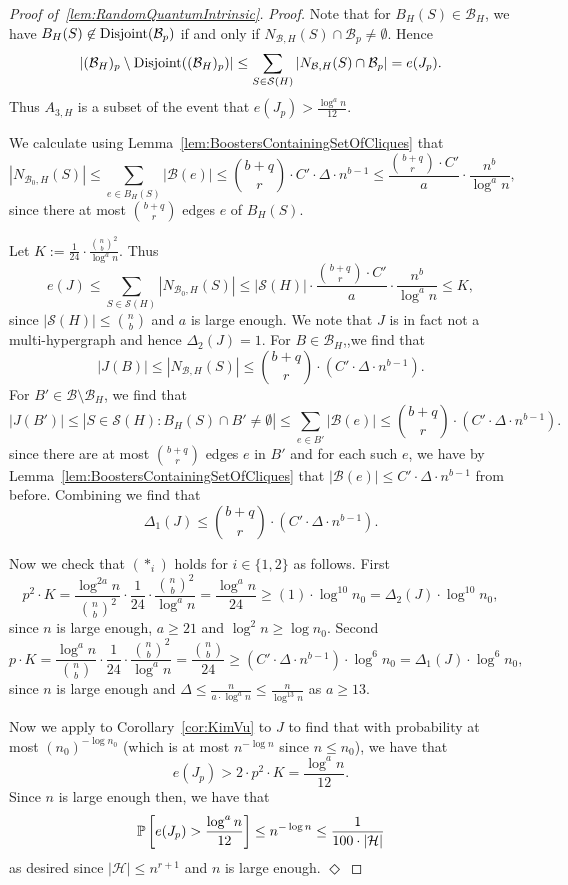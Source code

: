 \documentclass[11pt]{article}
\newcommand{\mc}[1]{\mathcal{#1}}
\newcounter{i}
\theoremstyle{plain}
\newenvironment{proofclaim}[1][]%
{\noindent \emph{Proof.} {}{#1}{}}{\hfill
	$\Diamond$\vspace{1em}}
\renewcommand{\theclaim}{\thetheorem.\arabic{claim}}
\newenvironment{lateproof}[1]
 {%
  \renewcommand{\theclaim}{\ref{#1}.\arabic{claim}}%
  \begin{proof}[Proof of~\cref{#1}]%
 }
 {\end{proof}}
\theoremstyle{plain} %
\theoremstyle{definition}
\newcommand{\Prob}[1]{\ensuremath{%
\mathbb P\left[#1\right]
}}
\begin{document}
\begin{lateproof}{lem:RandomQuantumIntrinsic}
\begin{proofclaim}
Note that for $B_H(S)\in \mc{B}_{H}$, we have $B_H(S)\not\in {\rm Disjoint}(\mc{B}_p)$ if and only if $N_{\mathcal{B},H}(S)\cap \mathcal{B}_p\ne \emptyset$. Hence
$$|(\mathcal{B}_{H})_p\setminus {\rm Disjoint}((\mathcal{B}_{H})_p)| \le \sum_{S\in \mc{S}(H)} |N_{\mathcal{B},H}(S)\cap \mathcal{B}_p| = e(J_p).$$
Thus $A_{3,H}$ is a subset of the event that $e(J_p) > \frac{\log^{a} n}{12}$.

We calculate using Lemma~\ref{lem:BoostersContainingSetOfCliques} that
$$ |N_{\mathcal{B}_0,H}(S)| \le \sum_{e\in B_H(S)} |\mc{B}(e)| \le \binom{b+q}{r} \cdot C' \cdot \Delta \cdot n^{b-1} \le \frac{\binom{b+q}{r} \cdot C'}{a}\cdot \frac{n^b}{\log^{a} n},$$
since there at most $\binom{b+q}{r}$ edges $e$ of $B_H(S)$.

Let $K:= \frac{1}{24} \cdot \frac{\binom{n}{b}^2}{\log^{a} n}$. Thus
$$e(J) \le \sum_{S\in \mc{S}(H)} |N_{\mathcal{B}_0,H}(S)| \le |\mc{S}(H)|\cdot \frac{\binom{b+q}{r} \cdot C'}{a}\cdot \frac{n^b}{\log^{a} n} \le K,$$
since $|\mc{S}(H)|\le \binom{n}{b}$ and $a$ is large enough. We note that $J$ is in fact not a multi-hypergraph and hence $\Delta_2(J) = 1$.
For $B\in \mc{B}_H$,,we find that
$$|J(B)| \le |N_{\mc{B},H}(S)| \le \binom{b+q}{r}\cdot (C'\cdot \Delta \cdot n^{b-1}).$$
For $B'\in \mc{B}\setminus \mc{B}_H$, we find that
$$|J(B')| \le |S\in \mc{S}(H): B_H(S)\cap B'\ne \emptyset| \le \sum_{e\in B'} |\mc{B}(e)| \le \binom{b+q}{r}\cdot (C'\cdot \Delta \cdot n^{b-1}).$$
since there are at most $\binom{b+q}{r}$ edges $e$ in $B'$ and for each such $e$, we have by Lemma~\ref{lem:BoostersContainingSetOfCliques} that $|\mc{B}(e)| \le C'\cdot \Delta \cdot n^{b-1}$ from before. Combining we find that
$$\Delta_1(J) \le \binom{b+q}{r}\cdot (C'\cdot \Delta \cdot n^{b-1}).$$

Now we check that $(*_i)$ holds for $i\in \{1,2\}$ as follows. First
$$p^2 \cdot K = \frac{\log^{2a} n}{\binom{n}{b}^2} \cdot \frac{1}{24} \cdot \frac{\binom{n}{b}^2}{\log^{a} n} = \frac{\log^{a} n}{24} \ge (1)\cdot \log^{10} n_0 = \Delta_2(J)\cdot \log^{10} n_0,$$
since $n$ is large enough, $a\ge 21$ and $\log^2 n \ge \log n_0$.
Second
$$p \cdot K = \frac{\log^{a} n}{\binom{n}{b}} \cdot \frac{1}{24} \cdot \frac{\binom{n}{b}^2 }{\log^{a} n } = \frac{\binom{n}{b}}{24} \ge (C'\cdot \Delta \cdot n^{b-1})\cdot \log^6 n_0 = \Delta_1(J)\cdot \log^6 n_0,$$
since $n$ is large enough and $\Delta\le \frac{n}{a\cdot \log^{a} n} \le \frac{n}{\log^{13} n}$ as $a\ge 13$.

Now we apply to Corollary~\ref{cor:KimVu} to $J$ to find that with probability at most $(n_0)^{-\log n_0}$ (which is at most $n^{-\log n}$ since $n\le n_0$), we have that
$$e(J_p) > 2\cdot p^2\cdot K = \frac{\log^{a} n}{12}.$$ 
Since $n$ is large enough then, we have that
$$\Prob{e(J_p) > \frac{\log^a n}{12}} \le n^{-\log n} \le  \frac{1}{100\cdot |\mc{H}|}$$
as desired since $|\mc{H}| \le n^{r+1}$ and $n$ is large enough.
\end{proofclaim}


\end{lateproof}
\end{document}
